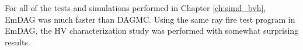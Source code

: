 For all of the tests and simulations performed in Chapter \ref{ch:simd_bvh},
EmDAG was much faster than DAGMC. Using the same ray fire test program in EmDAG,
the HV characterization study was performed with somewhat surprising results. 




